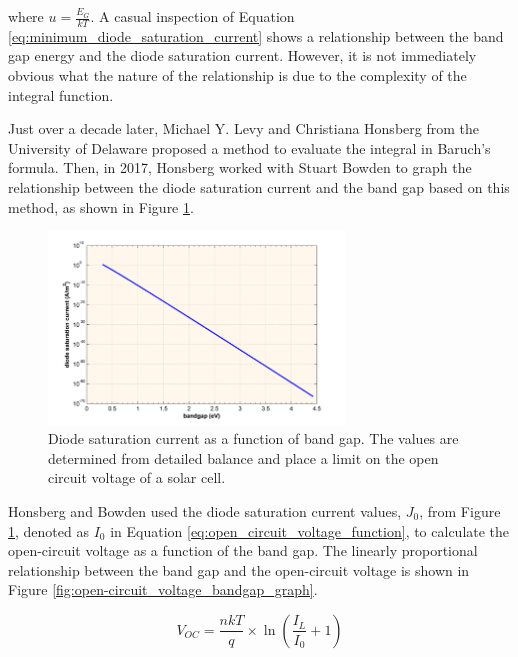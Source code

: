 \noindent where $u = \frac{E_G}{kT}$. \cite{Baruch1995OnConversion} A casual inspection of Equation \ref{eq:minimum_diode_saturation_current} shows a relationship between the band gap energy and the diode saturation current. However, it is not immediately obvious what the nature of the relationship is due to the complexity of the integral function.\vspace{0.5em}

\noindent Just over a decade later, Michael Y. Levy and Christiana Honsberg from the University of Delaware proposed a method to evaluate the integral in Baruch's formula. \cite{Levy2006RapidApplications} Then, in 2017, Honsberg worked with Stuart Bowden to graph the relationship between the diode saturation current and the band gap based on this method, as shown in Figure \ref{fig:diode_saturation_current_bandgap_graph}.\par

\begin{figure}[ht]
    \centering
    \includegraphics[width=0.7\textwidth]{Figures/diode_saturation_current_bandgap_graph.png}
    \caption{Diode saturation current as a function of band gap. The values are determined from detailed balance and place a limit on the open circuit voltage of a solar cell. \cite{HonsbergOpen-CircuitVoltage}}
    \label{fig:diode_saturation_current_bandgap_graph}
\end{figure}
\FloatBarrier

\noindent Honsberg and Bowden used the diode saturation current values, $J_0$, from Figure \ref{fig:diode_saturation_current_bandgap_graph}, denoted as $I_0$ in Equation \ref{eq:open_circuit_voltage_function}, to calculate the open-circuit voltage as a function of the band gap. The linearly proportional relationship between the band gap and the open-circuit voltage is shown in Figure \ref{fig:open-circuit_voltage_bandgap_graph}.

\begin{equation}
    V_{OC} = \frac{n k T}{q} \times \ln\left(\frac{I_L}{I_0} + 1\right)
    \label{eq:open_circuit_voltage_function}
\end{equation}

